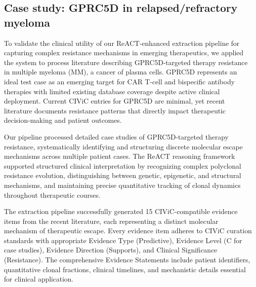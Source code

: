% 
%
%

\subsection{Case study: GPRC5D in relapsed/refractory myeloma}\label{subsec3}

To validate the clinical utility of our ReACT-enhanced extraction pipeline for capturing complex resistance mechanisms in emerging therapeutics, we applied the system to process literature describing GPRC5D-targeted therapy resistance in multiple myeloma (MM), a cancer of plasma cells. GPRC5D represents an ideal test case as an emerging target for CAR T-cell and bispecific antibody therapies with limited existing database coverage despite active clinical deployment. Current CIViC entries for GPRC5D are minimal, yet recent literature documents resistance patterns that directly impact therapeutic decision-making and patient outcomes.

Our pipeline processed detailed case studies of GPRC5D-targeted therapy resistance, systematically identifying and structuring discrete molecular escape mechanisms across multiple patient cases\cite{bib20,bib21}. The ReACT reasoning framework supported structured clinical interpretation by recognizing complex polyclonal resistance evolution, distinguishing between genetic, epigenetic, and structural mechanisms, and maintaining precise quantitative tracking of clonal dynamics throughout therapeutic courses.

The extraction pipeline successfully generated 15 CIViC-compatible evidence items from the recent literature\cite{bib20,bib21}, each representing a distinct molecular mechanism of therapeutic escape. Every evidence item adheres to CIViC curation standards with appropriate Evidence Type (Predictive), Evidence Level (C for case studies), Evidence Direction (Supports), and Clinical Significance (Resistance). The comprehensive Evidence Statements include patient identifiers, quantitative clonal fractions, clinical timelines, and mechanistic details essential for clinical application.

